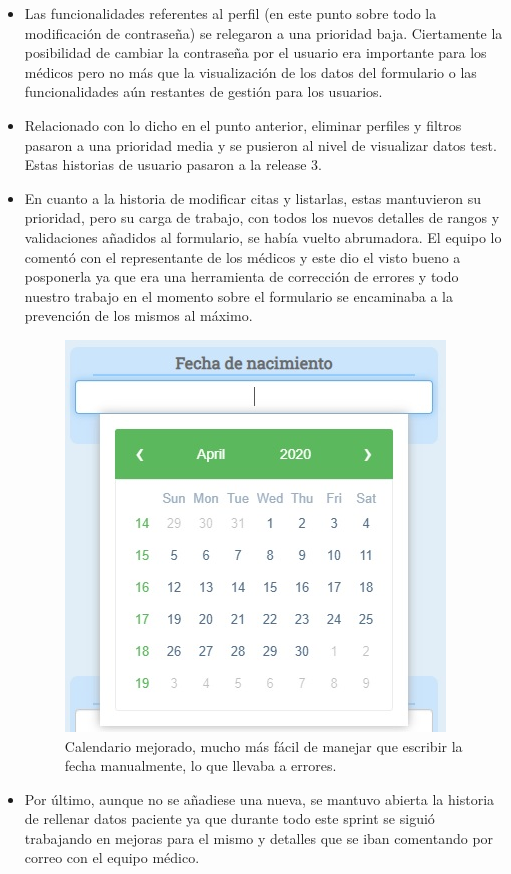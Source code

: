 \begin{itemize}
    \item Las funcionalidades referentes al perfil (en este punto sobre todo la modificación de contraseña) se relegaron a una prioridad baja. Ciertamente la posibilidad de cambiar la contraseña por el usuario era importante para los médicos pero no más que la visualización de los datos del formulario o las funcionalidades aún restantes de gestión para los usuarios.\newline
    
    \item Relacionado con lo dicho en el punto anterior, eliminar perfiles y filtros pasaron a una prioridad media y se pusieron al nivel de visualizar datos test. Estas historias de usuario pasaron a la release 3.\newline
    
    \item En cuanto a la historia de modificar citas y listarlas, estas mantuvieron su prioridad, pero su carga de trabajo, con todos los nuevos detalles de rangos y validaciones añadidos al formulario, se había vuelto abrumadora. El equipo lo comentó con el representante de los médicos y este dio el visto bueno a posponerla ya que era una herramienta de corrección de errores y todo nuestro trabajo en el momento sobre el formulario se encaminaba a la prevención de los mismos al máximo.\newline
    
    \begin{figure}[h]
    \centering
     \includegraphics[width=7.cm,height=7.cm]{images/calendario.jpg}
    \caption{Calendario mejorado, mucho más fácil de manejar que escribir la fecha manualmente, lo que llevaba a errores.}
    \end{figure}
    
    \item Por último, aunque no se añadiese una nueva, se mantuvo abierta la historia de rellenar datos paciente ya que durante todo este sprint se siguió trabajando en mejoras para el mismo y detalles que se iban comentando por correo con el equipo médico. \newline
\end{itemize}
\newpage

